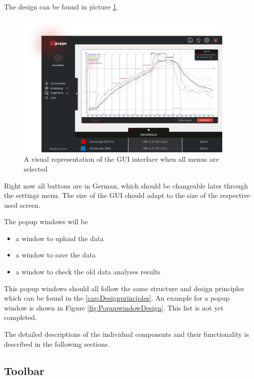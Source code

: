 \documentclass{scrreprt}
\begin{document}
The design can be found in picture \ref{fig: GUI}. 
\begin{figure}[!h]
    \includegraphics[width= 400px]{assets/pictures/Start Oszi (1).pdf}
    \caption[]{A visual representation of the GUI interface when all menus are selected}
    \label{fig: GUI}
\end{figure}
Right now all buttons are in German, which should be changeable later through the settings menu. 
The size of the GUI should adapt to the size of the respective used screen.

The popup windows will be 
\begin{itemize}
    \item a window to upload the data
    \item a window to save the data 
    \item a window to check the old data analyses results 
\end{itemize}

This popup windows should all follow the same structure and design principles which can be found in the \ref{cap:Designprinciples}. 
An example for a popup window is shown in Figure \ref{fig:PopupwindowDesign}.
This list is not yet completed. 

The detailed descriptions of the individual components and their functionality is described in the following sections.


\subsection{Toolbar}
\end{document}
